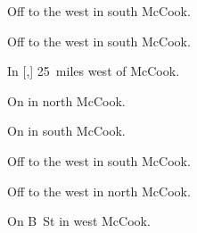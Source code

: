 
\begin{LocationList}

Off  to the west in south McCook.

Off  to the west in south McCook.

\Location{\GasStation \Gas \Rest}
In [,] 25~miles west of McCook.

On  in north McCook.

On  in south McCook.

Off  to the west in south McCook.

\Location{\TruckService \Service}
Off  to the west in north McCook.

On   B~St in west McCook.

\end{LocationList}

